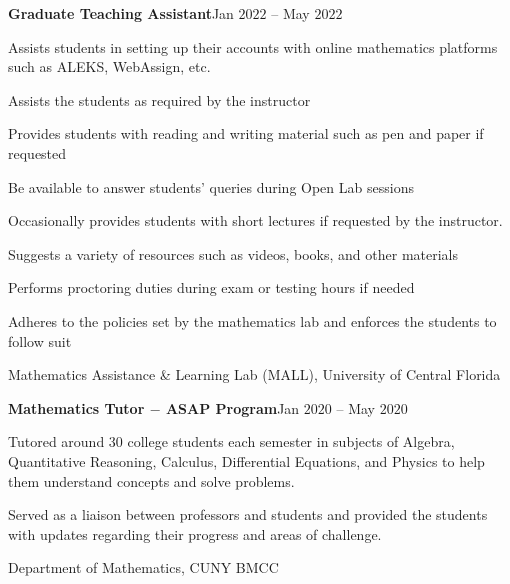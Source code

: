 \documentclass[a4paper, 12pt]{article}
\begin{document}
\begin{flushleft}
\begin{flushleft}
\textbf{Graduate Teaching Assistant}\hfill Jan $2022$ -- May $2022$\\
\begin{compactitem}
    \item Assists students in setting up their accounts with online mathematics platforms such as ALEKS, WebAssign, etc.
    \item Assists the students as required by the instructor
    \item Provides students with reading and writing material such as pen and paper if requested
    \item Be available to answer students' queries during Open Lab sessions
    \item Occasionally provides students with short lectures if requested by the instructor.
    \item Suggests a variety of resources such as videos, books, and other materials
    \item Performs proctoring duties during exam or testing hours if needed
    \item Adheres to the policies set by the mathematics lab and enforces the students to follow suit
\end{compactitem}
Mathematics Assistance \& Learning Lab (MALL), University of Central Florida
\end{flushleft}

\begin{flushleft}
\textbf{Mathematics Tutor $-$ ASAP Program}\hfill Jan $2020$ -- May $2020$\\
\begin{compactitem}
    \item Tutored around $30$ college students each semester in subjects of Algebra, Quantitative Reasoning, Calculus, Differential Equations, and Physics to help them understand concepts and solve problems.
    \item Served as a liaison between professors and students and provided the students with updates regarding their progress and areas of challenge.
\end{compactitem}
Department of Mathematics, CUNY BMCC
\end{flushleft}


\end{flushleft}
\end{document}
